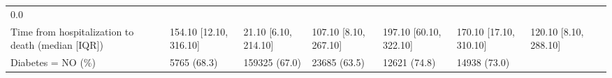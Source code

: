 \documentclass[10pt,letterpaper]{article}
\begin{document}
\begin{longtable}[]{@{}lllllllr@{}}
\begin{minipage}[t]{0.05\columnwidth}
0.0\strut
\end{minipage}\tabularnewline
\begin{minipage}[t]{0.20\columnwidth}\raggedright
Time from hospitalization to death (median {[}IQR{]})\strut
\end{minipage} & \begin{minipage}[t]{0.09\columnwidth}\raggedright
154.10 {[}12.10, 316.10{]}\strut
\end{minipage} & \begin{minipage}[t]{0.08\columnwidth}\raggedright
21.10 {[}6.10, 214.10{]}\strut
\end{minipage} & \begin{minipage}[t]{0.08\columnwidth}\raggedright
107.10 {[}8.10, 267.10{]}\strut
\end{minipage} & \begin{minipage}[t]{0.11\columnwidth}\raggedright
197.10 {[}60.10, 322.10{]}\strut
\end{minipage} & \begin{minipage}[t]{0.09\columnwidth}\raggedright
170.10 {[}17.10, 310.10{]}\strut
\end{minipage} & \begin{minipage}[t]{0.08\columnwidth}\raggedright
120.10 {[}8.10, 288.10{]}\strut
\end{minipage} & \begin{minipage}[t]{0.05\columnwidth}\raggedleft
0.0\strut
\end{minipage}\tabularnewline
\begin{minipage}[t]{0.20\columnwidth}\raggedright
Diabetes = NO (\%)\strut
\end{minipage} & \begin{minipage}[t]{0.09\columnwidth}\raggedright
5765 (68.3)\strut
\end{minipage} & \begin{minipage}[t]{0.08\columnwidth}\raggedright
159325 (67.0)\strut
\end{minipage} & \begin{minipage}[t]{0.08\columnwidth}\raggedright
23685 (63.5)\strut
\end{minipage} & \begin{minipage}[t]{0.11\columnwidth}\raggedright
12621 (74.8)\strut
\end{minipage} & \begin{minipage}[t]{0.09\columnwidth}\raggedright
14938 (73.0)\strut
\end{minipage} & \begin{minipage}[t]{0.08\columnwidth}\raggedright

\end{minipage}
\end{longtable}
\end{document}
